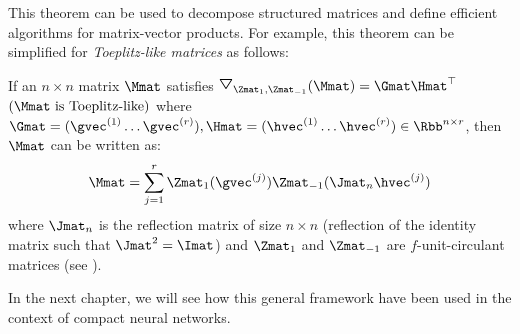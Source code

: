 \noindent
This theorem can be used to decompose structured matrices and define efficient algorithms for matrix-vector products.
For example, this theorem can be simplified for \emph{Toeplitz-like matrices} as follows:
\begin{theorem} \label{theorem:ch2-toeplitz_like}
  If an $n \times n$ matrix $\Mmat$ satisfies $\triangleopdown_{\Zmat_1, \Zmat_{-1}}(\Mmat) = \Gmat \Hmat^\top$ $(\Mmat \text{ is Toeplitz-like})$ where $\Gmat = (\gvec ^{(1)} \ldots \gvec^{(r)}), \Hmat = (\hvec^{(1)} \ldots \hvec^{(r)}) \in \Rbb^{n \times r}$, then $\Mmat$ can be written as: 
  \begin{equation} \label{equation:ch2-toeplitz_like_matrix_decomposition}
    \Mmat = \sum_{j=1}^{r} \Zmat_1(\gvec^{(j)}) \Zmat_{-1}(\Jmat_n \hvec^{(j)})
  \end{equation}
  where $\Jmat_n$ is the reflection matrix of size $n \times n$ (reflection of the identity matrix such that $\Jmat^2 = \Imat$) and $\Zmat_1$ and $\Zmat_{-1}$ are $f$-unit-circulant matrices (see ).
\end{theorem}
\noindent
In the next chapter, we will see how this general framework have been used in the context of compact neural networks.


